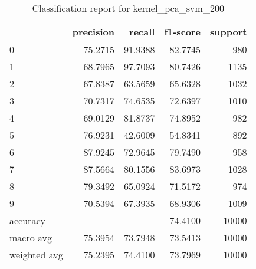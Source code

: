 \begin{table}[htb!]
\centering
\begin{tabular}{lrrrr}
    \toprule
    & precision & recall & f1-score & support \\
    \midrule
    0 & 75.2715 & 91.9388 & 82.7745 & 980 \\
    1 & 68.7965 & 97.7093 & 80.7426 & 1135 \\
    2 & 67.8387 & 63.5659 & 65.6328 & 1032 \\
    3 & 70.7317 & 74.6535 & 72.6397 & 1010 \\
    4 & 69.0129 & 81.8737 & 74.8952 & 982 \\
    5 & 76.9231 & 42.6009 & 54.8341 & 892 \\
    6 & 87.9245 & 72.9645 & 79.7490 & 958 \\
    7 & 87.5664 & 80.1556 & 83.6973 & 1028 \\
    8 & 79.3492 & 65.0924 & 71.5172 & 974 \\
    9 & 70.5394 & 67.3935 & 68.9306 & 1009 \\
    accuracy & & & 74.4100 & 10000 \\
    macro avg & 75.3954 & 73.7948 & 73.5413 & 10000 \\
    weighted avg & 75.2395 & 74.4100 & 73.7969 & 10000 \\
    \bottomrule
\end{tabular}
\caption{Classification report for kernel_pca_svm_200}
\label{tab:classification-report-kernel_pca_svm_200}
\end{table}
